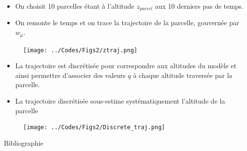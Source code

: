 \documentclass[10pt]{beamer}
\begin{document}
\begin{frame}{\secname}
    \begin{itemize}
        \item On choisit 10 parcelles étant à l'altitude $z_{parcel}$ aux 10 derniers pas de temps. 
        \item On remonte le temps et on trace la trajectoire de la parcelle, gouvernée par $w_{\mu}$.
    \end{itemize}
    \begin{figure}[hbtp]
        \centering
        \texttt{[image: ../Codes/Figs2/ztraj.png]}
    \end{figure}
\end{frame}

\begin{frame}{\secname}
    \begin{itemize}
        \item La trajectoire est discrétisée pour correspondre aux altitudes du modèle et ainsi permettre d'associer des valeurs $q$ à chaque altitude traversée par la parcelle. 
        \item La trajectoire discrétisée sous-estime systématiquement l'altitude de la parcelle
    \end{itemize}
    \begin{figure}[hbtp]
        \centering
        \texttt{[image: ../Codes/Figs2/Discrete\_traj.png]}
    \end{figure}
\end{frame}

\begin{frame}[allowframebreaks]{Bibliographie}
    \printbibliography
\end{frame}
\end{document}
